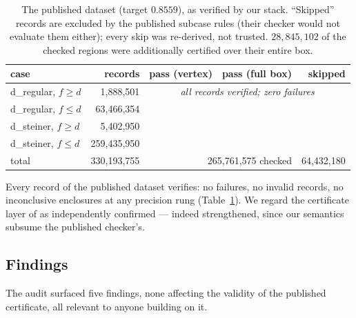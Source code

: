 \documentclass[11pt]{article}
\begin{document}
\begin{table}[t]
\centering
\begin{tabular}{lrrrr}
\toprule
case & records & pass (vertex) & pass (full box) & skipped \\
\midrule
d\_regular, $f\ge d$ & 1{,}888{,}501 & \multicolumn{3}{c}{\emph{all records verified; zero failures}}\\
d\_regular, $f\le d$ & 63{,}466{,}354 & & & \\
d\_steiner, $f\ge d$ & 5{,}402{,}950 & & & \\
d\_steiner, $f\le d$ & 259{,}435{,}950 & & & \\
\midrule
total & 330{,}193{,}755 & \multicolumn{2}{r}{265{,}761{,}575 checked} & 64{,}432{,}180 \\
\bottomrule
\end{tabular}
\caption{The published dataset (target $0.8559$), as verified by our
stack. ``Skipped'' records are excluded by the published subcase rules
(their checker would not evaluate them either); every skip was
re-derived, not trusted. $28{,}845{,}102$ of the checked regions were
additionally certified over their entire box.}
\label{tab:audit}
\end{table}

Every record of the published dataset verifies: no failures, no invalid
records, no inconclusive enclosures at any precision rung
(Table~\ref{tab:audit}). We regard the certificate layer of \cite{PKU26}
as independently confirmed --- indeed strengthened, since our semantics
subsume the published checker's.

\subsection{Findings}\label{sec:findings}

The audit surfaced five findings, none affecting the validity of the
published certificate, all relevant to anyone building on it.
\end{document}
